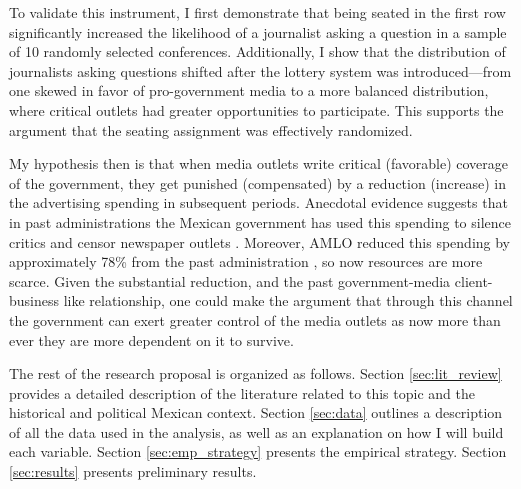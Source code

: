 To validate this instrument, I first demonstrate that being seated in the first row significantly increased the likelihood of a journalist asking a question in a sample of 10 randomly selected conferences. Additionally, I show that the distribution of journalists asking questions shifted after the lottery system was introduced—from one skewed in favor of pro-government media to a more balanced distribution, where critical outlets had greater opportunities to participate. This supports the argument that the seating assignment was effectively randomized.

My hypothesis then is that when media outlets write critical (favorable) coverage of the government, they get punished (compensated) by a reduction (increase) in the advertising spending in subsequent periods. Anecdotal evidence suggests that in past administrations the Mexican government has used this spending to silence critics and censor newspaper outlets \citep{Times}. Moreover, AMLO reduced this spending by approximately 78\% from the past administration \citep{Article19}, so now resources are more scarce. Given the substantial reduction, and the past government-media client-business like relationship, one could make the argument that through this channel the government can exert greater control of the media outlets as now more than ever they are more dependent on it to survive.

The rest of the research proposal is organized as follows. Section \ref{sec:lit_review} provides a detailed description of the literature related to this topic and the historical and political Mexican context. Section \ref{sec:data} outlines a description of all the data used in the analysis, as well as an explanation on how I will build each variable. Section \ref{sec:emp_strategy} presents the empirical strategy. Section \ref{sec:results} presents preliminary results.
